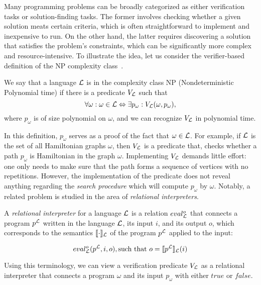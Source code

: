 Many programming problems can be broadly categorized as either verification tasks or solution-finding tasks. 
The former involves checking whether a given solution meats certain criteria, which is often straightforward to implement and inexpensive to run. 
On the other hand, the latter requires discovering a solution that satisfies the problem's constraints, which can be significantly more complex and resource-intensive. 
To illustrate the idea, let us consider the verifier-based definition of the NP complexity class~\cite{Garey:1990}. 

\begin{definition}
  We say that a language $\mathcal{L}$ is in the complexity class NP (Nondeterministic Polynomial time) if there is a predicate $V_{\mathcal{L}}$ such that 
  \[ 
    \forall \omega: \omega \in \mathcal{L} \Leftrightarrow \exists p_{\omega} : V_{\mathcal{L}}(\omega, p_{\omega}), 
  \]
  where $p_{\omega}$ is of size polynomial on $\omega$, and we can recognize $V_{\mathcal{L}}$ in polynomial time. 
\end{definition}

In this definition, $p_\omega$ serves as a proof of the fact that $\omega \in \mathcal{L}$. 
For example, if $\mathcal{L}$ is the set of all Hamiltonian graphs $\omega$, then $V_{\mathcal{L}}$ is a predicate that, checks whether a path $p_{\omega}$ is Hamiltonian in the graph $\omega$. 
Implementing $V_{\mathcal{L}}$ demands little effort: one only needs to make sure that the path forms a sequence of vertices with no repetitions. 
However, the implementation of the predicate does not reveal anything regarding the \emph{search procedure} which will compute $p_{\omega}$ by $\omega$. 
Notably, a related problem is studied in the area of \emph{relational interpreters}. 

\begin{definition}
  A \emph{relational interpreter} for a language $\mathcal{L}$ is a relation $eval^{o}_{\mathcal{L}}$ that connects a program $p^{\mathcal{L}}$ written in the language $\mathcal{L}$, its input $i$, and its output $o$, which corresponds to the semantics $\llbracket \cdot \rrbracket_{\mathcal{L}}$ of the program $p^{\mathcal{L}}$ applied to the input: 

  \[
  eval^{o}_{\mathcal{L}}(p^{\mathcal{L}}, i, o), \text{such that } o = \llbracket p^{\mathcal{L}} \rrbracket_{\mathcal{L}}(i)
  \]
\end{definition}

Using this terminology, we can view a verification predicate $V_{\mathcal{L}}$ as a relational interpreter that connects a program $\omega$ and its input $p_{\omega}$ with either $true$ or $false$. 

